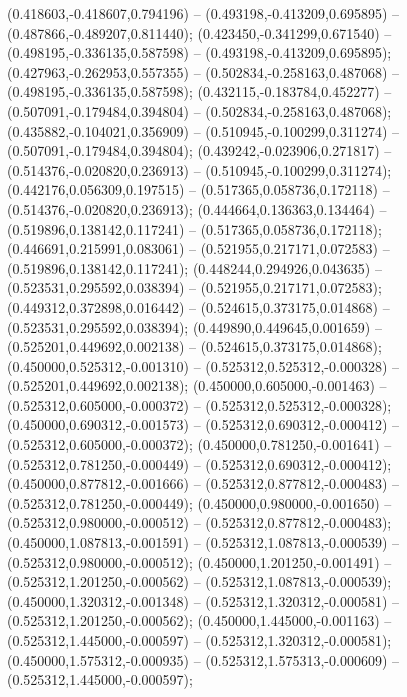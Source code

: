  (0.418603,-0.418607,0.794196) -- (0.493198,-0.413209,0.695895) -- (0.487866,-0.489207,0.811440);
 (0.423450,-0.341299,0.671540) -- (0.498195,-0.336135,0.587598) -- (0.493198,-0.413209,0.695895);
 (0.427963,-0.262953,0.557355) -- (0.502834,-0.258163,0.487068) -- (0.498195,-0.336135,0.587598);
 (0.432115,-0.183784,0.452277) -- (0.507091,-0.179484,0.394804) -- (0.502834,-0.258163,0.487068);
 (0.435882,-0.104021,0.356909) -- (0.510945,-0.100299,0.311274) -- (0.507091,-0.179484,0.394804);
 (0.439242,-0.023906,0.271817) -- (0.514376,-0.020820,0.236913) -- (0.510945,-0.100299,0.311274);
 (0.442176,0.056309,0.197515) -- (0.517365,0.058736,0.172118) -- (0.514376,-0.020820,0.236913);
 (0.444664,0.136363,0.134464) -- (0.519896,0.138142,0.117241) -- (0.517365,0.058736,0.172118);
 (0.446691,0.215991,0.083061) -- (0.521955,0.217171,0.072583) -- (0.519896,0.138142,0.117241);
 (0.448244,0.294926,0.043635) -- (0.523531,0.295592,0.038394) -- (0.521955,0.217171,0.072583);
 (0.449312,0.372898,0.016442) -- (0.524615,0.373175,0.014868) -- (0.523531,0.295592,0.038394);
 (0.449890,0.449645,0.001659) -- (0.525201,0.449692,0.002138) -- (0.524615,0.373175,0.014868);
 (0.450000,0.525312,-0.001310) -- (0.525312,0.525312,-0.000328) -- (0.525201,0.449692,0.002138);
 (0.450000,0.605000,-0.001463) -- (0.525312,0.605000,-0.000372) -- (0.525312,0.525312,-0.000328);
 (0.450000,0.690312,-0.001573) -- (0.525312,0.690312,-0.000412) -- (0.525312,0.605000,-0.000372);
 (0.450000,0.781250,-0.001641) -- (0.525312,0.781250,-0.000449) -- (0.525312,0.690312,-0.000412);
 (0.450000,0.877812,-0.001666) -- (0.525312,0.877812,-0.000483) -- (0.525312,0.781250,-0.000449);
 (0.450000,0.980000,-0.001650) -- (0.525312,0.980000,-0.000512) -- (0.525312,0.877812,-0.000483);
 (0.450000,1.087813,-0.001591) -- (0.525312,1.087813,-0.000539) -- (0.525312,0.980000,-0.000512);
 (0.450000,1.201250,-0.001491) -- (0.525312,1.201250,-0.000562) -- (0.525312,1.087813,-0.000539);
 (0.450000,1.320312,-0.001348) -- (0.525312,1.320312,-0.000581) -- (0.525312,1.201250,-0.000562);
 (0.450000,1.445000,-0.001163) -- (0.525312,1.445000,-0.000597) -- (0.525312,1.320312,-0.000581);
 (0.450000,1.575312,-0.000935) -- (0.525312,1.575313,-0.000609) -- (0.525312,1.445000,-0.000597);
